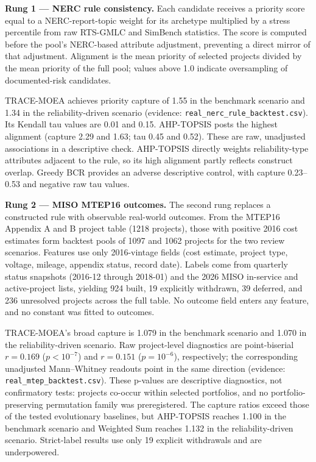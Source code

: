 \documentclass[
  10pt,
  a4paper,
]{article}
\begin{document}
\textbf{Rung 1 --- NERC rule consistency.} Each candidate receives a
priority score equal to a NERC-report-topic weight for its archetype
multiplied by a stress percentile from raw RTS-GMLC and SimBench
statistics. The score is computed before the pool's NERC-based attribute
adjustment, preventing a direct mirror of that adjustment. Alignment is
the mean priority of selected projects divided by the mean priority of
the full pool; values above 1.0 indicate oversampling of documented-risk
candidates.

TRACE-MOEA achieves priority capture of 1.55 in the benchmark scenario
and 1.34 in the reliability-driven scenario (evidence:
\texttt{real\_nerc\_rule\_backtest.csv}). Its Kendall tau values are
0.01 and 0.15. AHP-TOPSIS posts the highest alignment (capture 2.29 and
1.63; tau 0.45 and 0.52). These are raw, unadjusted associations in a
descriptive check. AHP-TOPSIS directly weights reliability-type
attributes adjacent to the rule, so its high alignment partly reflects
construct overlap. Greedy BCR provides an adverse descriptive control,
with capture 0.23--0.53 and negative raw tau values.

\textbf{Rung 2 --- MISO MTEP16 outcomes.} The second rung replaces a
constructed rule with observable real-world outcomes. From the MTEP16
Appendix A and B project table (1218 projects), those with positive 2016
cost estimates form backtest pools of 1097 and 1062 projects for the two
review scenarios. Features use only 2016-vintage fields (cost estimate,
project type, voltage, mileage, appendix status, record date). Labels
come from quarterly status snapshots (2016-12 through 2018-01) and the
2026 MISO in-service and active-project lists, yielding 924 built, 19
explicitly withdrawn, 39 deferred, and 236 unresolved projects across
the full table. No outcome field enters any feature, and no constant was
fitted to outcomes.

TRACE-MOEA's broad capture is 1.079 in the benchmark scenario and 1.070
in the reliability-driven scenario. Raw project-level diagnostics are
point-biserial \(r=0.169\) (\(p<10^{-7}\)) and \(r=0.151\)
(\(p=10^{-6}\)), respectively; the corresponding unadjusted
Mann--Whitney readouts point in the same direction (evidence:
\texttt{real\_mtep\_backtest.csv}). These p-values are descriptive
diagnostics, not confirmatory tests: projects co-occur within selected
portfolios, and no portfolio-preserving permutation family was
preregistered. The capture ratios exceed those of the tested
evolutionary baselines, but AHP-TOPSIS reaches 1.100 in the benchmark
scenario and Weighted Sum reaches 1.132 in the reliability-driven
scenario. Strict-label results use only 19 explicit withdrawals and are
underpowered.
\end{document}
